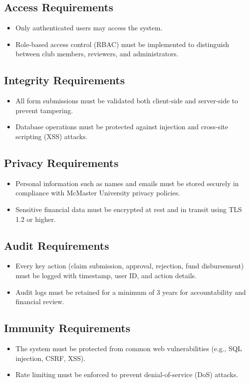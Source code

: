 \documentclass[12pt]{article}
\begin{document}
\subsection{Access Requirements}
\begin{itemize}
    \item Only authenticated users may access the system.
    \item Role-based access control (RBAC) must be implemented to distinguish between club members, reviewers, and administrators.
\end{itemize}

\subsection{Integrity Requirements}
\begin{itemize}
    \item All form submissions must be validated both client-side and server-side to prevent tampering.
    \item Database operations must be protected against injection and cross-site scripting (XSS) attacks.
\end{itemize}

\subsection{Privacy Requirements}
\begin{itemize}
    \item Personal information such as names and emails must be stored securely in compliance with McMaster University privacy policies.
    \item Sensitive financial data must be encrypted at rest and in transit using TLS 1.2 or higher.
\end{itemize}

\subsection{Audit Requirements}
\begin{itemize}
    \item Every key action (claim submission, approval, rejection, fund disbursement) must be logged with timestamp, user ID, and action details.
    \item Audit logs must be retained for a minimum of 3 years for accountability and financial review.
\end{itemize}

\subsection{Immunity Requirements}
\begin{itemize}
    \item The system must be protected from common web vulnerabilities (e.g., SQL injection, CSRF, XSS).
    \item Rate limiting must be enforced to prevent denial-of-service (DoS) attacks.
\end{itemize}
\end{document}

